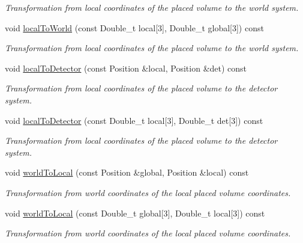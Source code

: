 \begin{DoxyCompactItemize}
\begin{DoxyCompactList}\small\item\em Transformation from local coordinates of the placed volume to the world system. \end{DoxyCompactList}\item 
void \hyperlink{class_d_d4hep_1_1_alignments_1_1_alignment_decorator_a60bcb9a0fd83b49f845bf7e7c1352c53}{local\+To\+World} (const Double\+\_\+t local\mbox{[}3\mbox{]}, Double\+\_\+t global\mbox{[}3\mbox{]}) const
\begin{DoxyCompactList}\small\item\em Transformation from local coordinates of the placed volume to the world system. \end{DoxyCompactList}\item 
void \hyperlink{class_d_d4hep_1_1_alignments_1_1_alignment_decorator_ad4152c1e6ebc6fdfc45fd4d86ea0985b}{local\+To\+Detector} (const Position \&local, Position \&det) const
\begin{DoxyCompactList}\small\item\em Transformation from local coordinates of the placed volume to the detector system. \end{DoxyCompactList}\item 
void \hyperlink{class_d_d4hep_1_1_alignments_1_1_alignment_decorator_a8282dd7cfdbe0b1e07f84710cb029178}{local\+To\+Detector} (const Double\+\_\+t local\mbox{[}3\mbox{]}, Double\+\_\+t det\mbox{[}3\mbox{]}) const
\begin{DoxyCompactList}\small\item\em Transformation from local coordinates of the placed volume to the detector system. \end{DoxyCompactList}\item 
void \hyperlink{class_d_d4hep_1_1_alignments_1_1_alignment_decorator_af4046e3ac4e33de6c0c1f66eedc34ec2}{world\+To\+Local} (const Position \&global, Position \&local) const
\begin{DoxyCompactList}\small\item\em Transformation from world coordinates of the local placed volume coordinates. \end{DoxyCompactList}\item 
void \hyperlink{class_d_d4hep_1_1_alignments_1_1_alignment_decorator_aa88ffdd4bbbcbb7879828b3df405db31}{world\+To\+Local} (const Double\+\_\+t global\mbox{[}3\mbox{]}, Double\+\_\+t local\mbox{[}3\mbox{]}) const
\begin{DoxyCompactList}\small\item\em Transformation from world coordinates of the local placed volume coordinates. \end{DoxyCompactList}\item 

\end{DoxyCompactItemize}
